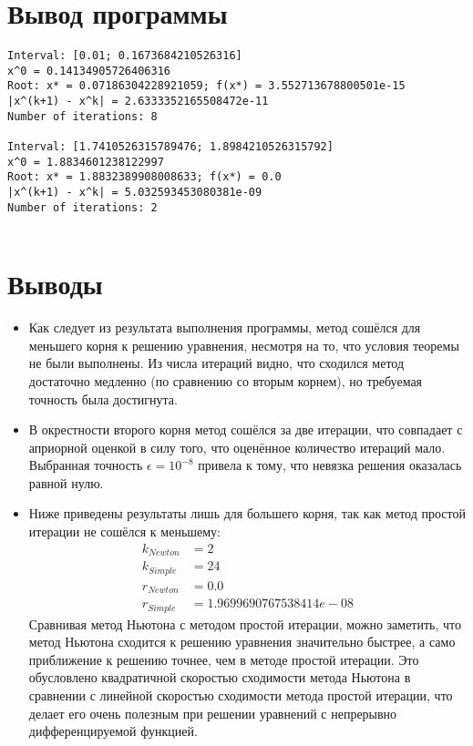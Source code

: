 \documentclass[14pt, a4paper]{article}
\begin{document}
  \section{Вывод программы}
\begin{verbatim}
Interval: [0.01; 0.1673684210526316]
x^0 = 0.14134905726406316
Root: x* = 0.07186304228921059; f(x*) = 3.552713678800501e-15
|x^(k+1) - x^k| = 2.6333352165508472e-11
Number of iterations: 8

Interval: [1.7410526315789476; 1.8984210526315792]
x^0 = 1.8834601238122997
Root: x* = 1.8832389908008633; f(x*) = 0.0
|x^(k+1) - x^k| = 5.032593453080381e-09
Number of iterations: 2


\end{verbatim}

  \section{Выводы}
  \begin{itemize}
  \item
  Как следует из результата выполнения программы, метод сошёлся для меньшего корня к решению уравнения, несмотря на то, что условия теоремы не были выполнены.
  Из числа итераций видно, что сходился метод достаточно медленно (по сравнению со вторым корнем), но требуемая точность была достигнута.
  \item
  В окрестности второго корня метод сошёлся за две итерации, что совпадает с априорной оценкой в силу того, что оценённое количество итераций мало. Выбранная точность $\epsilon = 10^{-8}$
  привела к тому, что невязка решения оказалась равной нулю.
  \item
  Ниже приведены результаты лишь для большего корня, так как метод простой итерации не сошёлся к меньшему:
  \begin{align*}
  k_{Newton} &= 2 \\
  k_{Simple} &= 24 \\ 
  r_{Newton} &= 0.0 \\
  r_{Simple} &= 1.9699690767538414e-08
  \end{align*}
  Сравнивая метод Ньютона с методом простой итерации, можно заметить, что метод Ньютона сходится к решению уравнения значительно быстрее, а само приближение к решению точнее, чем в методе простой итерации.
  Это обусловлено квадратичной скоростью сходимости метода Ньютона в сравнении с линейной скоростью сходимости метода простой итерации, что делает его очень полезным при решении уравнений с непрерывно дифференцируемой функцией.
  \end{itemize}
\end{document}
